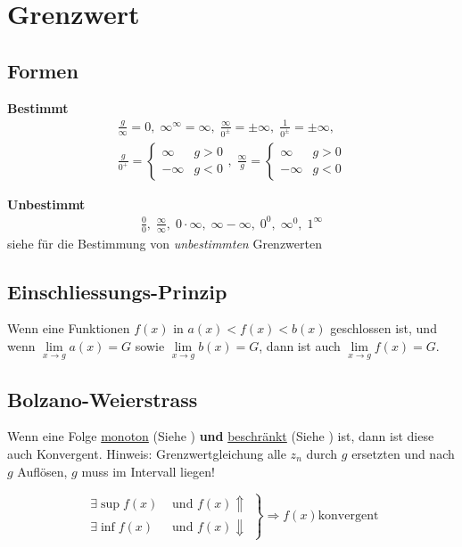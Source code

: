 \section{Grenzwert}
\subsection{Formen}
\noindent\textbf{Bestimmt}
\begin{align*}
	\frac{g}{\infty} = 0,\; 
	\infty^\infty = \infty,\; 
	\frac{\infty}{0^\pm} = \pm\infty,\;
	\frac{1}{0^\pm} = \pm\infty,\;
	\\
	\frac{g}{0^+} = \begin{cases} \infty & g > 0\\-\infty & g < 0 \end{cases},\;
	\frac{\infty}{g} = \begin{cases} \infty & g > 0\\-\infty & g < 0 \end{cases}
\end{align*}

\noindent\textbf{Unbestimmt}
\begin{align*}
	\frac{0}{0},\;
	\frac{\infty}{\infty},\;
	0\cdot\infty,\;
	\infty - \infty,\;
	0^0,\; \infty^0,\;
	1^\infty
\end{align*}
siehe  für die Bestimmung von \textit{unbestimmten} Grenzwerten

\subsection{Einschliessungs-Prinzip}\label{einschliessungsprinzip}
Wenn eine Funktionen $f(x)$ in $a(x) < f(x) < b(x)$ geschlossen ist, und wenn $\lim\limits_{x \rightarrow g}a(x) = G$ sowie $\lim\limits_{x \rightarrow g}b(x) = G$, dann ist auch $\lim\limits_{x \rightarrow g}f(x) = G$. 

\subsection{Bolzano-Weierstrass}\label{bolzano}
Wenn eine Folge \underline{monoton} (Siehe ) \textbf{und} \underline{beschränkt} (Siehe ) ist, dann ist diese auch Konvergent. Hinweis: Grenzwertgleichung alle $z_n$ durch $g$ ersetzten und nach $g$ Auflösen, $g$ muss im Intervall liegen!

\[
\left.\begin{aligned}
	\exists\sup f(x) &\text{ und } f(x) \Uparrow \\
	\exists\inf f(x) &\text{ und } f(x) \Downarrow
\end{aligned}
\right\rbrace \Rightarrow 
f(x) \text{konvergent}
\]

